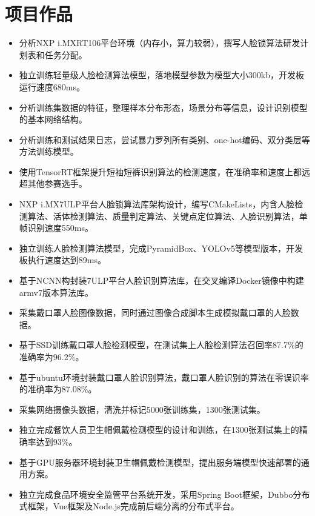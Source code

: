 \documentclass{resume}
\begin{document}
\section{项目作品}
\begin{itemize}
  \item 分析NXP i.MXRT106平台环境（内存小，算力较弱），撰写人脸锁算法研发计划表和任务分配。
  \item 独立训练轻量级人脸检测算法模型，落地模型参数为模型大小300kb，开发板运行速度680ms。
\end{itemize}
\begin{itemize}
  \item 分析训练集数据的特征，整理样本分布形态，场景分布等信息，设计识别模型的基本网络结构。
  \item 分析训练和测试结果日志，尝试暴力罗列所有类别、one-hot编码、双分类层等方法训练模型。
  \item 使用TensorRT框架提升短袖短裤识别算法的检测速度，在准确率和速度上都远超其他参赛选手。
\end{itemize}
\begin{itemize}
  \item NXP i.MX7ULP平台人脸锁算法库架构设计，编写CMakeLists，内含人脸检测算法、活体检测算法、质量判定算法、关键点定位算法、人脸识别算法，单帧识别速度550ms。
  \item 独立训练人脸检测算法模型，完成PyramidBox、YOLOv5等模型版本，开发板执行速度达到89ms。
  \item 基于NCNN构封装7ULP平台人脸识别算法库，在交叉编译Docker镜像中构建armv7版本算法库。
\end{itemize}
\begin{itemize}
  \item 采集戴口罩人脸图像数据，同时通过图像合成脚本生成模拟戴口罩的人脸数据。
  \item 基于SSD训练戴口罩人脸检测模型，在测试集上人脸检测算法召回率87.7$\%$的准确率为96.2$\%$。
  \item 基于ubuntu环境封装戴口罩人脸识别算法，戴口罩人脸识别的算法在零误识率的准确率为87.08$\%$。
\end{itemize}
\begin{itemize}
  \item 采集网络摄像头数据，清洗并标记5000张训练集，1300张测试集。
  \item 独立完成餐饮人员卫生帽佩戴检测模型的设计和训练，在1300张测试集上的精确率达到93$\%$。
  \item 基于GPU服务器环境封装卫生帽佩戴检测模型，提出服务端模型快速部署的通用方案。
  \item 独立完成食品环境安全监管平台系统开发，采用Spring Boot框架，Dubbo分布式框架，Vue框架及Node.js完成前后端分离的分布式平台。
\end{itemize}
\end{document}
